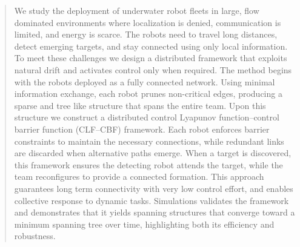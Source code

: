 \documentclass[conference]{IEEEconf}
\theoremstyle{plain}
\begin{document}
\begin{abstract}
We study the deployment of underwater robot fleets in large, flow dominated environments where localization is denied, communication is limited, and energy is scarce. The robots need to travel long distances, detect emerging targets, and stay connected using only local information. To meet these challenges we design a distributed framework that exploits natural drift and activates control only when required. The method begins with the robots deployed as a fully connected network. Using minimal information exchange, each robot prunes non-critical edges, producing a sparse and tree like structure that spans the entire team. Upon this structure we construct a distributed control Lyapunov function–control barrier function (CLF–CBF) framework. Each robot enforces barrier constraints to maintain the necessary connections, while redundant links are discarded when alternative paths emerge. When a target is discovered, this framework ensures the detecting robot attends the target, while the team reconfigures to provide a connected formation. This approach guarantees long term connectivity with very low control effort, and enables collective response to dynamic tasks. Simulations validates the framework and demonstrates that it yields spanning structures that converge toward a minimum spanning tree over time, highlighting both its efficiency and robustness.
\end{abstract}
\end{document}
